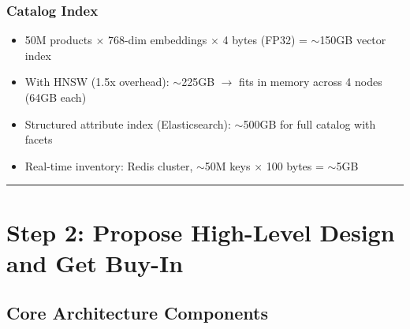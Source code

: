 \subsubsection*{Catalog Index}

\begin{itemize}
  \item 50M products $\times$ 768-dim embeddings $\times$ 4 bytes (FP32) = $\sim$150GB vector index
  \item With HNSW (1.5x overhead): $\sim$225GB $\rightarrow$ fits in memory across 4 nodes (64GB each)
  \item Structured attribute index (Elasticsearch): $\sim$500GB for full catalog with facets
  \item Real-time inventory: Redis cluster, $\sim$50M keys $\times$ 100 bytes = $\sim$5GB
\end{itemize}

\bigskip\hrule\bigskip

\section*{Step 2: Propose High-Level Design and Get Buy-In}

\subsection*{Core Architecture Components}

